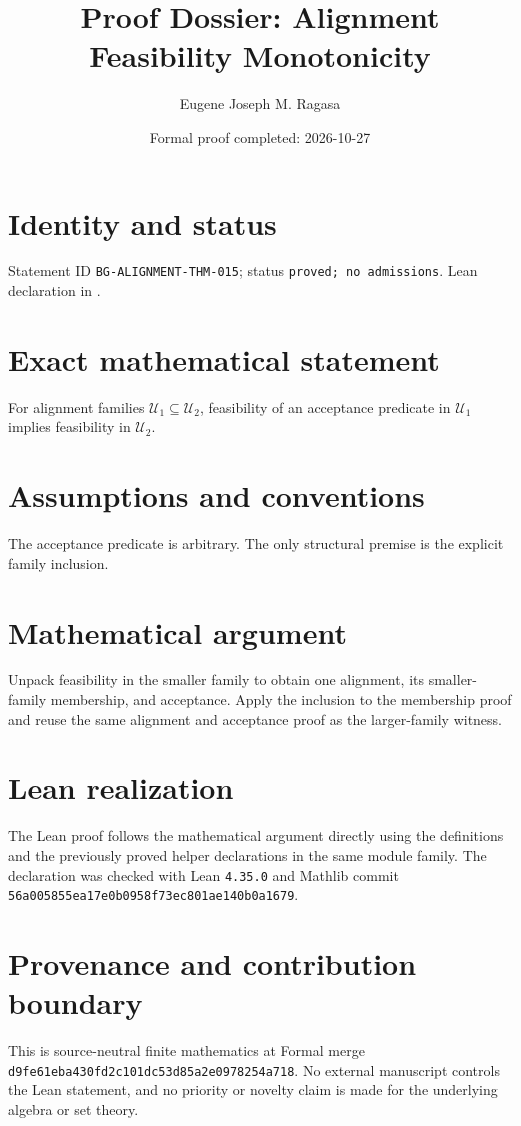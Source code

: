 \documentclass[11pt]{article}
\title{Proof Dossier: Alignment Feasibility Monotonicity}
\author{Eugene Joseph M. Ragasa}
\date{Formal proof completed: 2026-10-27}
\begin{document}
\raggedright
\maketitle

\section{Identity and status}
Statement ID \texttt{BG-ALIGNMENT-THM-015}; status \texttt{proved; no admissions}.  Lean declaration
 in
.

\section{Exact mathematical statement}
For alignment families $\mathcal U_1\subseteq\mathcal U_2$, feasibility of an acceptance predicate in $\mathcal U_1$ implies feasibility in $\mathcal U_2$.

\section{Assumptions and conventions}
The acceptance predicate is arbitrary.  The only structural premise is the explicit family inclusion.

\section{Mathematical argument}
Unpack feasibility in the smaller family to obtain one alignment, its smaller-family membership, and acceptance.  Apply the inclusion to the membership proof and reuse the same alignment and acceptance proof as the larger-family witness.

\section{Lean realization}
The Lean proof follows the mathematical argument directly using the definitions and the
previously proved helper declarations in the same module family.  The declaration was checked
with Lean \texttt{4.35.0} and Mathlib commit \texttt{56a005855ea17e0b0958f73ec801ae140b0a1679}.

\section{Provenance and contribution boundary}
This is source-neutral finite mathematics at Formal merge
\texttt{d9fe61eba430fd2c101dc53d85a2e0978254a718}.  No external manuscript controls the Lean statement, and no priority or
novelty claim is made for the underlying algebra or set theory.
\end{document}
